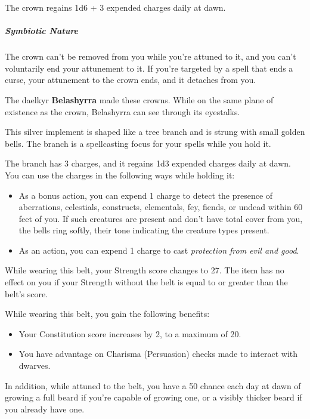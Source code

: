 \documentclass[10pt,a4paper,twoside,bg=print,twocolumn,openany,nodeprecatedcode]{dndbook}
\begin{document}
The crown regains 1d6 + 3 expended charges daily at dawn.

\subparagraph{Symbiotic Nature}
The crown can't be removed from you while you're attuned to it, and you can't voluntarily end your attunement to it. If you're targeted by a spell that ends a curse, your attunement to the crown ends, and it detaches from you.

The daelkyr \textbf{Belashyrra} made these crowns. While on the same plane of existence as the crown, Belashyrra can see through its eyestalks.

This silver implement is shaped like a tree branch and is strung with small golden bells. The branch is a spellcasting focus for your spells while you hold it.

The branch has 3 charges, and it regains 1d3 expended charges daily at dawn. You can use the charges in the following ways while holding it:


\begin{itemize}
\item As a bonus action, you can expend 1 charge to detect the presence of aberrations, celestials, constructs, elementals, fey, fiends, or undead within 60 feet of you. If such creatures are present and don't have total cover from you, the bells ring softly, their tone indicating the creature types present.
\item As an action, you can expend 1 charge to cast \textit{protection from evil and good}.
\end{itemize}

While wearing this belt, your Strength score changes to 27. The item has no effect on you if your Strength without the belt is equal to or greater than the belt's score.

While wearing this belt, you gain the following benefits:


\begin{itemize}
\item Your Constitution score increases by 2, to a maximum of 20.
\item You have advantage on Charisma (Persuasion) checks made to interact with dwarves.
\end{itemize}

In addition, while attuned to the belt, you have a 50 chance each day at dawn of growing a full beard if you're capable of growing one, or a visibly thicker beard if you already have one.
\end{document}
